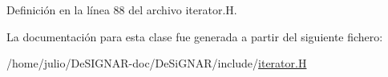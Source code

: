 Definición en la línea 88 del archivo iterator.\+H.



La documentación para esta clase fue generada a partir del siguiente fichero\+:\begin{DoxyCompactItemize}
\item 
/home/julio/\+De\+S\+I\+G\+N\+A\+R-\/doc/\+De\+Si\+G\+N\+A\+R/include/\hyperlink{iterator_8_h}{iterator.\+H}\end{DoxyCompactItemize}

